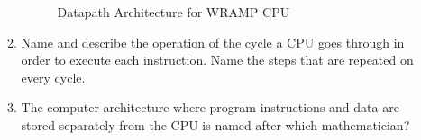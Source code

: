 \documentclass[a4paper,10pt]{article}
\begin{document}
\begin{enumerate}
\begin{enumerate}
\begin{figure}[htb]
\begin{center}
    \caption{Datapath Architecture for WRAMP CPU}
    \label{fig:wrampblok}
  \end{center}
\end{figure}




\item Name and describe the operation of the cycle a CPU goes through in order
to execute each instruction.  Name the steps that are repeated on every cycle.


\item The computer architecture where program instructions and data are stored
separately from the CPU is named after which mathematician?


\end{enumerate}

\end{enumerate}

\newpage
\newpage

\appendix


\newcommand{\subscrsm}[1]{\raisebox{-0.5ex}{\tiny #1}}  %
\newcommand{\regdsm}{R\subscrsm{d}}
\newcommand{\regssm}{R\subscrsm{s}}
\newcommand{\regtsm}{R\subscrsm{t}}


\newcommand{\mem}[1]{[ #1 ]}
\newcommand{\signextend}{\int}

\newcommand{\rtype}[2]
	   { \scriptsize{\texttt{#1 dddd ssss #2 0000 0000 0000 tttt}} } 
\newcommand{\itype}[2]
	   { \scriptsize{\texttt{#1 dddd ssss #2 iiii iiii iiii iiii} } }
\newcommand{\jtype}[3]
	   { \scriptsize{\texttt{#1 #2 #3 aaaa aaaa aaaa aaaa aaaa} } }
\end{document}
